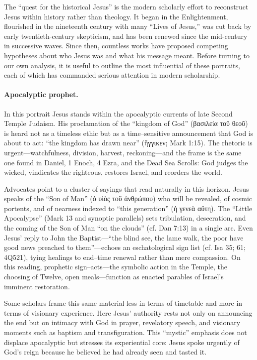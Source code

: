 The “quest for the historical Jesus” is the modern scholarly effort to reconstruct Jesus within history rather than theology.
It began in the Enlightenment, flourished in the nineteenth century with many “Lives of Jesus,” was cut back by early twentieth-century skepticism, and has been renewed since the mid-century in successive waves.
Since then, countless works have proposed competing hypotheses about who Jesus was and what his message meant.
Before turning to our own analysis, it is useful to outline the most influential of these portraits, each of which has commanded serious attention in modern scholarship.

\paragraph{Apocalyptic prophet.}

In this portrait Jesus stands within the apocalyptic currents of late Second Temple Judaism.
His proclamation of the “kingdom of God” (βασιλεία τοῦ θεοῦ) is heard not as a timeless ethic but as a time–sensitive announcement that God is about to act: “the kingdom has drawn near” (ἤγγικεν; Mark 1:15).
The rhetoric is urgent—watchfulness, division, harvest, reckoning—and the frame is the same one found in Daniel, 1 Enoch, 4 Ezra, and the Dead Sea Scrolls: God judges the wicked, vindicates the righteous, restores Israel, and reorders the world.

Advocates point to a cluster of sayings that read naturally in this horizon.
Jesus speaks of the “Son of Man” (ὁ υἱὸς τοῦ ἀνθρώπου) who will be revealed, of cosmic portents, and of nearness indexed to “this generation” (ἡ γενεὰ αὕτη).
The “Little Apocalypse” (Mark 13 and synoptic parallels) sets tribulation, desecration, and the coming of the Son of Man “on the clouds” (cf. Dan 7:13) in a single arc.
Even Jesus’ reply to John the Baptist—“the blind see, the lame walk, the poor have good news preached to them”—echoes an eschatological sign list (cf. Isa 35; 61; 4Q521), tying healings to end–time renewal rather than mere compassion.
On this reading, prophetic sign–acts—the symbolic action in the Temple, the choosing of Twelve, open meals—function as enacted parables of Israel’s imminent restoration.

Some scholars frame this same material less in terms of timetable and more in terms of visionary experience.
Here Jesus’ authority rests not only on announcing the end but on intimacy with God in prayer, revelatory speech, and visionary moments such as baptism and transfiguration.
This “mystic” emphasis does not displace apocalyptic but stresses its experiential core: Jesus spoke urgently of God’s reign because he believed he had already seen and tasted it.

